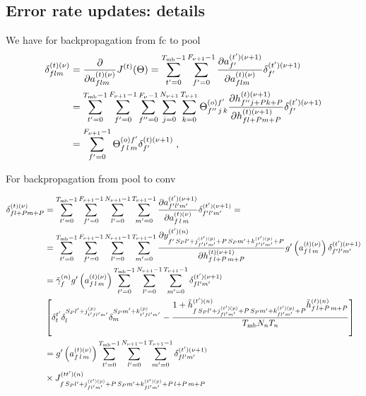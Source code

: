 \begin{subappendices}
\section{Error rate updates: details} \label{sec:appenderrorrate}

We have for backpropagation from fc to pool
\begin{align}
\delta^{(t)(\nu)}_{flm}&= \frac{\partial }{\partial a_{flm}^{(t)(\nu)}}J^{(t)}(\Theta)=
%
\sum_{t'=0}^{T_{{\rm mb}}-1}\sum_{f'=0}^{F_{\nu+1}-1}
%
 \frac{\partial a_{f'}^{(t')(\nu+1)}}{\partial a_{flm}^{(t)(\nu)}} \delta^{(t')(\nu+1)}_{f'}\notag\\
%
&=\sum_{t'=0}^{T_{{\rm mb}}-1}\sum_{f'=0}^{F_{\nu+1}-1}\sum^{F_\nu-1}_{f''=0}
%
\sum^{N_{\nu+1}}_{j=0}\sum^{T_{\nu+1}}_{k=0}\Theta^{(o)f'}_{f''\,j\,k}
%
\frac{\partial h^{(t)(\nu+1)}_{f''j+Pk+P} }{\partial h_{fl+Pm+P}^{(t)(\nu+1)}} \delta^{(t')(\nu+1)}_{f'}\notag\\
%
&=\sum_{f'=0}^{F_{\nu+1}-1}\Theta^{(o)f'}_{f\,l\,m} \delta^{(t)(\nu+1)}_{f'}\;,
\end{align}

For backpropagation from pool to conv

\begin{align}
\delta^{(t)(\nu)}_{fl+Pm+P}&=
%
\sum_{t'=0}^{T_{{\rm mb}}-1}\sum^{F_{\nu+1}-1}_{f'=0}\sum^{N_{\nu+1}-1}_{l'=0}\sum^{T_{\nu+1}-1}_{m'=0}
%
\frac{\partial a_{f'l'm'}^{(t')(\nu+1)}}{\partial a_{f\,l\,m}^{(t)(\nu)}}
%
\delta_{f'l'm'}^{(t')(\nu+1)}
%
=\notag\\
%
&=\sum_{t'=0}^{T_{{\rm mb}}-1}\sum^{F_{\nu+1}-1}_{f'=0}\sum^{N_{\nu+1}-1}_{l'=0}\sum^{T_{\nu+1}-1}_{m'=0}
%
\frac{\partial y_{f'\,S_P l'+j_{f'l'm'}^{(t')(p)}+P\,S_Pm'+k_{f'l'm'}^{(t')(p)}+P}^{(t')(n)}}{\partial h_{f\,l+P\,m+P}^{(t)(\nu+1)}}
%
g'\left(a_{f\,l\,m}^{(t)(\nu)}\right)\delta_{f'l'm'}^{(t')(\nu+1)}\notag\\
%
&=\tilde{\gamma}^{(n)}_fg'\left(a_{f\,l\,m}^{(t)(\nu)}\right)
%
\sum_{t'=0}^{T_{{\rm mb}}-1}\sum^{N_{\nu+1}-1}_{l'=0}\sum^{T_{\nu+1}-1}_{m'=0}\delta_{fl'm'}^{(t')(\nu+1)}\notag\\
%
&\left[\delta^{t'}_t\delta^{S_P l'+j_{t'fl'm'}^{(p)}}_l\delta^{S_Pm'+k_{t'fl'm'}^{(p)}}_m-
%
\frac{1+\tilde{h}_{f\,S_P l'+j_{fl'm'}^{(t')(p)}+P\,S_Pm'+k_{fl'm'}^{(t')(p)}+P}^{(t')(n)}\tilde{h}_{f\,l+P\,m+P}^{(t)(n)}}{T_{{\rm mb}}N_{n}T_{n}}\right]\notag\\
%
&=g'\left(a_{f\,l\,m}^{(t)(\nu)}\right)\sum_{t'=0}^{T_{{\rm mb}}-1}\sum^{N_{\nu+1}-1}_{l'=0}
%
\sum^{T_{\nu+1}-1}_{m'=0}\delta_{fl'm'}^{(t')(\nu+1)}\notag\\
%
&\times J^{(tt')(n)}_{f\,S_P l'+j_{fl'm'}^{(t')(p)}+P\,S_Pm'+k_{fl'm'}^{(t')(p)}+P\,l+P\,m+P}
\end{align}


\end{subappendices}
